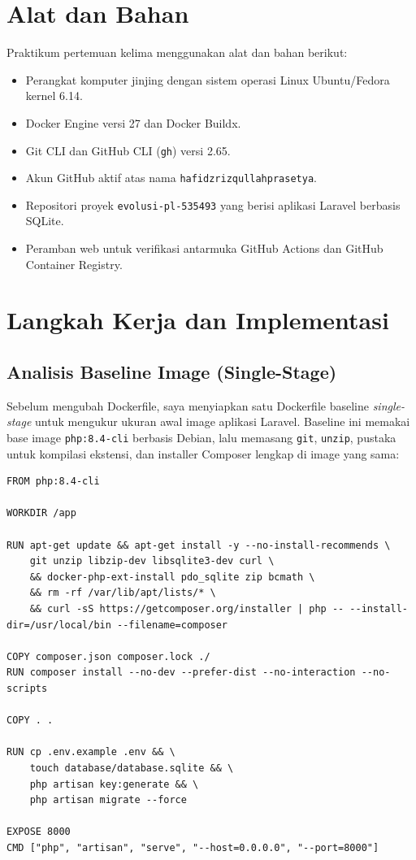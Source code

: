 \documentclass[a4paper,oneside,12pt]{report}
\begin{document}
\chapter{Alat dan Bahan}
Praktikum pertemuan kelima menggunakan alat dan bahan berikut:
\begin{itemize}
    \item Perangkat komputer jinjing dengan sistem operasi Linux Ubuntu/Fedora kernel 6.14.
    \item Docker Engine versi 27 dan Docker Buildx.
    \item Git CLI dan GitHub CLI (\texttt{gh}) versi 2.65.
    \item Akun GitHub aktif atas nama \texttt{hafidzrizqullahprasetya}.
    \item Repositori proyek \texttt{evolusi-pl-535493} yang berisi aplikasi Laravel berbasis SQLite.
    \item Peramban web untuk verifikasi antarmuka GitHub Actions dan GitHub Container Registry.
\end{itemize}

\clearpage

\chapter{Langkah Kerja dan Implementasi}

\section{Analisis Baseline Image (Single-Stage)}
Sebelum mengubah Dockerfile, saya menyiapkan satu Dockerfile baseline \textit{single-stage} untuk mengukur ukuran awal image aplikasi Laravel. Baseline ini memakai base image \texttt{php:8.4-cli} berbasis Debian, lalu memasang \texttt{git}, \texttt{unzip}, pustaka untuk kompilasi ekstensi, dan installer Composer lengkap di image yang sama:

\begin{lstlisting}[style=dockerstyle,caption={Dockerfile baseline single-stage sebagai pembanding.}]
FROM php:8.4-cli

WORKDIR /app

RUN apt-get update && apt-get install -y --no-install-recommends \
    git unzip libzip-dev libsqlite3-dev curl \
    && docker-php-ext-install pdo_sqlite zip bcmath \
    && rm -rf /var/lib/apt/lists/* \
    && curl -sS https://getcomposer.org/installer | php -- --install-dir=/usr/local/bin --filename=composer

COPY composer.json composer.lock ./
RUN composer install --no-dev --prefer-dist --no-interaction --no-scripts

COPY . .

RUN cp .env.example .env && \
    touch database/database.sqlite && \
    php artisan key:generate && \
    php artisan migrate --force

EXPOSE 8000
CMD ["php", "artisan", "serve", "--host=0.0.0.0", "--port=8000"]
\end{lstlisting}
\end{document}
